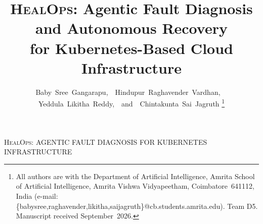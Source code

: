 \documentclass[journal,10pt,twoside]{IEEEtran}
\newcommand{\HealOps}{\textsc{HealOps}}
\begin{document}
\title{\HealOps: Agentic Fault Diagnosis and Autonomous Recovery\\
       for Kubernetes-Based Cloud Infrastructure}

\author{Baby~Sree~Gangarapu,~~Hindupur~Raghavender~Vardhan,~~%
        Yeddula~Likitha~Reddy,~~and~~Chintakunta~Sai~Jagruth%
\thanks{All authors are with the Department of Artificial Intelligence,
        Amrita School of Artificial Intelligence,
        Amrita Vishwa Vidyapeetham, Coimbatore~641112, India
        (e-mail: \{babysree,raghavender,likitha,saijagruth\}@cb.students.amrita.edu).
        Team D5. Manuscript received September~2026.}}

%
         {\HealOps: AGENTIC FAULT DIAGNOSIS FOR KUBERNETES INFRASTRUCTURE}

\maketitle
\end{document}
